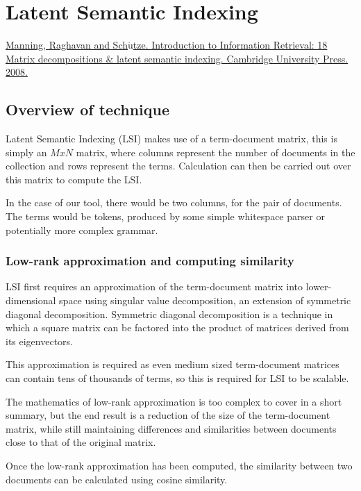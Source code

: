 \section{Latent Semantic Indexing}
\href{http://www-nlp.stanford.edu/IR-book/}{Manning, Raghavan and Sch$\mathrm{\ddot{u}}$tze. Introduction to Information Retrieval: 18 Matrix decompositions \& latent semantic indexing. Cambridge University Press. 2008.}
\subsection{Overview of technique}
Latent Semantic Indexing (LSI) makes use of a term-document matrix, this is simply an $M x N$ matrix, where columns represent the number of documents in the collection and rows represent the terms. Calculation can then be carried out over this matrix to compute the LSI.

In the case of our tool, there would be two columns, for the pair of documents. The terms would be tokens, produced by some simple whitespace parser or potentially more complex grammar.

\subsubsection{Low-rank approximation and computing similarity}
LSI first requires an approximation of the term-document matrix into lower-dimensional space using singular value decomposition, an extension of symmetric diagonal decomposition. Symmetric diagonal decomposition is a technique in which a square matrix can be factored into the product of matrices derived from its eigenvectors. 

This approximation is required as even medium sized term-document matrices can contain tens of thousands of terms, so this is required for LSI to be scalable.

The mathematics of low-rank approximation is too complex to cover in a short summary, but the end result is a reduction of the size of the term-document matrix, while still maintaining differences and similarities between documents close to that of the original matrix.

Once the low-rank approximation has been computed, the similarity between two documents can be calculated using cosine similarity.

